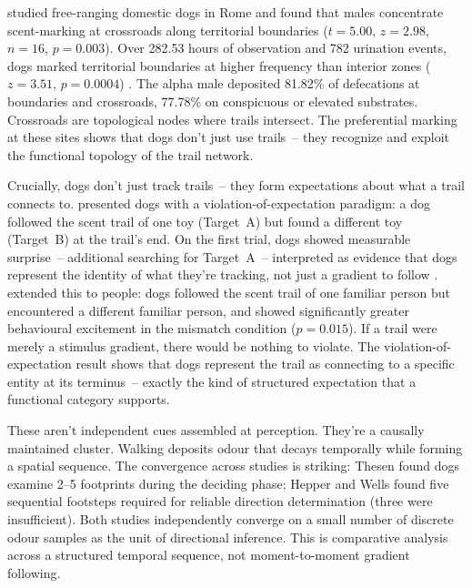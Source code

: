 \documentclass[12pt]{article}
\begin{document}
\textcite{cafazzo2012} studied free-ranging domestic dogs in Rome and found that males concentrate scent-marking at crossroads along territorial boundaries ($t = 5.00$, $z = 2.98$, $n = 16$, $p = 0.003$). Over 282.53 hours of observation and 782 urination events, dogs marked territorial boundaries at higher frequency than interior zones ($z = 3.51$, $p = 0.0004$) \citep[960]{cafazzo2012}. The alpha male deposited 81.82\% of defecations at boundaries and crossroads, 77.78\% on conspicuous or elevated substrates. Crossroads are topological nodes where trails intersect. The preferential marking at these sites shows that dogs don't just use trails~-- they recognize and exploit the functional topology of the trail network.

Crucially, dogs don't just track trails~-- they form expectations about what a trail connects to. \textcite{brauer2018} presented dogs with a violation-of-expectation paradigm: a dog followed the scent trail of one toy (Target~A) but found a different toy (Target~B) at the trail's end. On the first trial, dogs showed measurable surprise~-- additional searching for Target~A~-- interpreted as evidence that dogs represent the identity of what they're tracking, not just a gradient to follow \citep[194--195]{brauer2018}. \textcite{brauer2021} extended this to people: dogs followed the scent trail of one familiar person but encountered a different familiar person, and showed significantly greater behavioural excitement in the mismatch condition ($p = 0.015$). If a trail were merely a stimulus gradient, there would be nothing to violate. The violation-of-expectation result shows that dogs represent the trail as connecting to a specific entity at its terminus~-- exactly the kind of structured expectation that a functional category supports.

These aren't independent cues assembled at perception. They're a causally maintained cluster. Walking deposits odour that decays temporally while forming a spatial sequence. The convergence across studies is striking: Thesen found dogs examine 2--5 footprints during the deciding phase; Hepper and Wells found five sequential footsteps required for reliable direction determination (three were insufficient). Both studies independently converge on a small number of discrete odour samples as the unit of directional inference. This is comparative analysis across a structured temporal sequence, not moment-to-moment gradient following.
\end{document}

